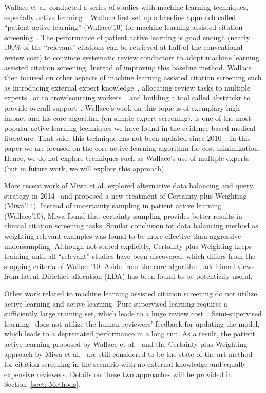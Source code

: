 \documentclass{svjour3}
\theoremstyle{break}
\begin{document}
Wallace et al. conducted a series of studies
with machine learning techniques, especially active
learning~\cite{wallace2010semi,wallace2010active,wallace2011should,wallace2012deploying,wallace2013active,wallace2013modernizing,nguyen2015combining}. Wallace
first set up a baseline approach called ``patient active learning'' (Wallace'10) for machine learning assisted citation screening~\cite{wallace2010semi}. The performance of patient active learning is good enough (nearly 100\% of the ``relevant''
citations can be retrieved at half of the conventional review cost) to convince
systematic review conductors to adopt machine learning assisted citation
screening. Instead of improving this baseline method, Wallace then focused on other aspects of machine learning assisted citation screening such as introducing external expert knowledge~\cite{wallace2010active}, allocating review tasks to multiple experts~\cite{wallace2011should} or to crowdsourcing workers~\cite{nguyen2015combining}, and building a tool called abstrackr to provide overall support~\cite{wallace2012deploying}. Wallace's work on this topic is of exemplary high-impact and his core algorithm   (on simple expert screening),   is one of the most popular active learning techniques we have found in the evidence-based medical literature. That said, this technique has not been updated since 2010~\cite{wallace2010semi}. In this paper we are focused on the core active learning algorithm for cost minimization. Hence, we do not explore techniques such as Wallace's use of multiple experts (but in future work, we will explore this approach).


More recent work of Miwa et al. explored alternative data balancing and query strategy in 2014~\cite{miwa2014reducing} and proposed a new treatment of Certainty plus Weighting (Miwa'14). Instead of uncertainty sampling in patient active learning (Wallace'10), Miwa found that certainty sampling provides better results in clinical citation screening tasks. Similar conclusion for data balancing method as weighting relevant examples was found to be more effective than aggressive undersampling. Although not stated explicitly, Certainty plus Weighting keeps training until all ``relevant'' studies have been discovered, which differs from the stopping criteria of Wallace'10. Aside from the core algorithm, additional views from latent Dirichlet allocation (LDA) has been found to be potentially useful.


Other work related to machine learning assisted citation screening do not
utilize active learning and active learning. Pure supervised learning requires a sufficiently large training set, which leads to a huge review cost~\cite{cohen2006reducing,adeva2014automatic}. Semi-supervised learning~\cite{liu2016comparative} does not utilize the human reviewers' feedback for updating the model, which leads to a depreciated performance in a long run. As a result, the patient active learning proposed by Wallace et al.~\cite{wallace2010semi} and the Certainty plus Weighting approach by Miwa et al.~\cite{miwa2014reducing} are still considered to be the state-of-the-art method for citation screening in the scenario with no external knowledge and equally expensive reviewers. Details on these two approaches will be provided in Section~\ref{sect: Methods}.
\end{document}
